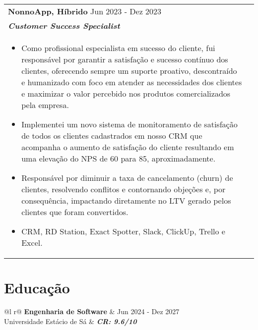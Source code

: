 \documentclass[a4paper,8pt]{article}
\begin{document}
\begin{tabularx}{\linewidth}{ @{}l r@{} }
\color[HTML]{1C033C} \textbf{{NonnoApp, Híbrido}} \hfill \color[HTML]{371e77} Jun 2023 - Dez 2023 \\
\color[HTML]{371e77}\textbf{\textit{Customer Success Specialist}} \\[5pt]
\begin{minipage}[t]{\linewidth}
\begin{itemize}[nosep,after=\strut, leftmargin=2em, itemsep=2pt]
\item Como profissional especialista em sucesso do cliente, fui responsável por garantir a satisfação e sucesso contínuo dos clientes, oferecendo sempre um suporte proativo, descontraído e humanizado com foco em atender as necessidades dos clientes e maximizar o valor percebido nos produtos comercializados pela empresa.
\item Implementei um novo sistema de monitoramento de satisfação de todos os clientes cadastrados em nosso CRM que acompanha o aumento de satisfação do cliente resultando em uma elevação do NPS de 60 para 85, aproximadamente.
\item Responsável por diminuir a taxa de cancelamento (churn) de clientes, resolvendo conflitos e contornando objeções e, por consequência, impactando diretamente no LTV gerado pelos clientes que foram convertidos.
\item CRM, RD Station, Exact Spotter, Slack, ClickUp, Trello e Excel.
\end{itemize}
\end{minipage}
\end{tabularx}

\section{Educação}
\begin{tabularx}{\linewidth}{ @{}l r@{} }
\color[HTML]{1C033C} \textbf{Engenharia de Software} & \hfill \color[HTML]{371e77} Jun 2024 - Dez 2027 \\
\color[HTML]{371e77} Universidade Estácio de Sá & \hfill \color[HTML]{4B28A4} \textit{\textbf{CR: 9.6/10}} \\
\end{tabularx}
\end{document}

